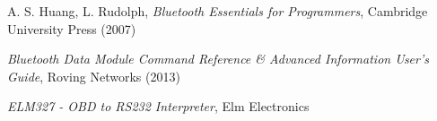 \documentclass[twoside]{article}
\begin{document}
\begin{multicols}{2}
\begin{thebibliography}{99}
\bibitem{} A. S. Huang, L. Rudolph,
  \emph{Bluetooth Essentials for Programmers},
  Cambridge University Press (2007)

\bibitem{}
  \emph{Bluetooth Data Module Command Reference \& Advanced Information User's Guide},
  Roving Networks (2013)
  
\bibitem{}
  \emph{ELM327 - OBD to RS232 Interpreter},
  Elm Electronics
 
\end{thebibliography}


\end{multicols}
\end{document}
